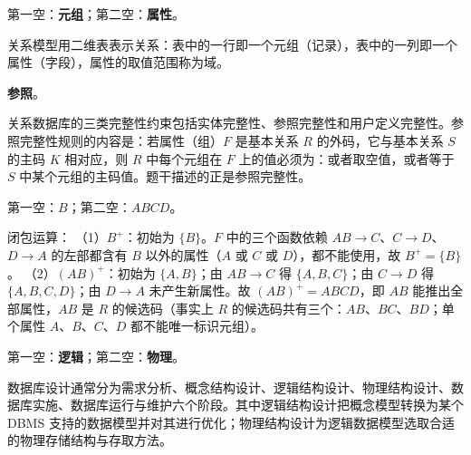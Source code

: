 \documentclass[a4paper,11pt]{article}
\begin{document}
\q 第一空：\textbf{元组}；第二空：\textbf{属性}。
\begin{analysis}
关系模型用二维表表示关系：表中的一行即一个元组（记录），表中的一列即一个属性（字段），属性的取值范围称为域。
\end{analysis}

\q \textbf{参照}。
\begin{analysis}
关系数据库的三类完整性约束包括实体完整性、参照完整性和用户定义完整性。参照完整性规则的内容是：若属性（组）$F$ 是基本关系 $R$ 的外码，它与基本关系 $S$ 的主码 $K$ 相对应，则 $R$ 中每个元组在 $F$ 上的值必须为：或者取空值，或者等于 $S$ 中某个元组的主码值。题干描述的正是参照完整性。
\end{analysis}

\q 第一空：\textbf{$B$}；第二空：\textbf{$ABCD$}。
\begin{analysis}
闭包运算：
（1）$B^{+}$：初始为 $\{B\}$。$F$ 中的三个函数依赖 $AB\to C$、$C\to D$、$D\to A$ 的左部都含有 $B$ 以外的属性（$A$ 或 $C$ 或 $D$），都不能使用，故 $B^{+}=\{B\}$。
（2）$(AB)^{+}$：初始为 $\{A,B\}$；由 $AB\to C$ 得 $\{A,B,C\}$；由 $C\to D$ 得 $\{A,B,C,D\}$；由 $D\to A$ 未产生新属性。故 $(AB)^{+}=ABCD$，即 $AB$ 能推出全部属性，$AB$ 是 $R$ 的候选码（事实上 $R$ 的候选码共有三个：$AB$、$BC$、$BD$；单个属性 $A$、$B$、$C$、$D$ 都不能唯一标识元组）。
\end{analysis}

\q 第一空：\textbf{逻辑}；第二空：\textbf{物理}。
\begin{analysis}
数据库设计通常分为需求分析、概念结构设计、逻辑结构设计、物理结构设计、数据库实施、数据库运行与维护六个阶段。其中逻辑结构设计把概念模型转换为某个 DBMS 支持的数据模型并对其进行优化；物理结构设计为逻辑数据模型选取合适的物理存储结构与存取方法。
\end{analysis}

\end{document}
